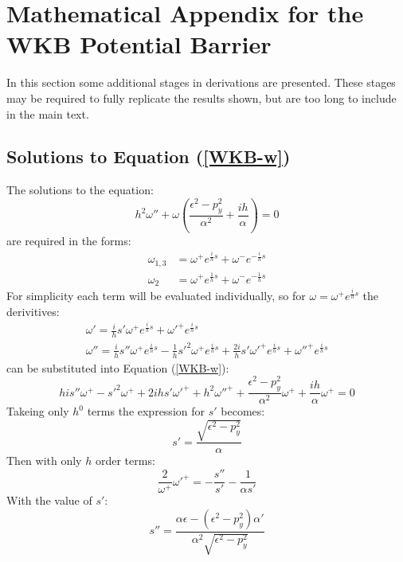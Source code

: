 	\section{Mathematical Appendix for the WKB Potential Barrier}
		In this section some additional stages in derivations are presented. These stages may be required to fully replicate the results shown, but are too long to include in the main text.
		\subsection{Solutions to Equation (\ref{WKB-w})}
		\label{Appendix-WKB-Solutions}
		The solutions to the equation:
		\begin{equation}
			h^{2}\omega''+\omega\left(\frac{\epsilon^{2}-p_{y}^{2}}{\alpha^{2}}+\frac{ih}{\alpha}\right)=0
		\end{equation}
		are required in the forms:
		\begin{align}
			\omega_{1,3}&=\omega^{+}e^{\frac{i}{h}s}+\omega^{-}e^{-\frac{i}{h}s}\\
			\omega_{2}&=\omega^{+}e^{\frac{1}{h}s}+\omega^{-}e^{-\frac{1}{h}s}
		\end{align}
		For simplicity each term will be evaluated individually, so for $\omega=\omega^{+}e^{\frac{i}{h}s}$ the derivitives:
		\begin{gather}
			\omega'=\frac{i}{h}s'\omega^{+}e^{\frac{i}{h}s}+\omega'^{+}e^{\frac{i}{h}s}\\
			\omega''=\frac{i}{h}s''\omega^{+}e^{\frac{i}{h}s}-\frac{1}{h}s'^{2}\omega^{+}e^{\frac{i}{h}s}+\frac{2i}{h}s'\omega'^{+}e^{\frac{i}{h}s}+\omega''^{+}e^{\frac{i}{h}s}
		\end{gather}
		can be substituted into Equation (\ref{WKB-w}):
		\begin{equation}
			his''\omega^{+}-s'^{2}\omega^{+}+2ihs'\omega'^{+}+h^{2}\omega''^{+}+\frac{\epsilon^{2}-p_{y}^{2}}{\alpha^{2}}\omega^{+}+\frac{ih}{\alpha}\omega^{+}=0
		\end{equation}
		Takeing only $h^{0}$ terms the expression for $s'$ becomes:
		\begin{equation}
			s'=\frac{\sqrt{\epsilon^{2}-p_{y}^{2}}}{\alpha}
		\end{equation}
		Then with only $h$ order terms:
		\begin{equation}
			\frac{2}{\omega^{+}}\omega'^{+}=-\frac{s''}{s'}-\frac{1}{\alpha s'}
		\end{equation}
		With the value of $s'$:
		\begin{equation}
			s''=\frac{\alpha\epsilon-\left(\epsilon^{2}-p_{y}^{2}\right)\alpha'}{\alpha^{2}\sqrt{\epsilon^{2}-p_{y}^{2}}}
		\end{equation}

